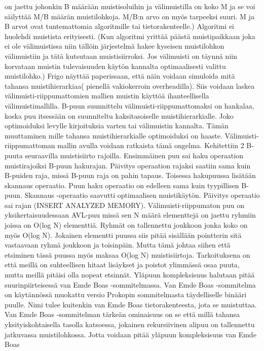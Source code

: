 \documentclass[finnish]{tktltiki2}
\theoremstyle{definition}
\theoremstyle{remark}
\begin{document}
on jaettu johonkin B määrään muistisoluihin ja välimuistilla on koko M ja se
voi säilyttää M/B määrän muistilohkoja. M/B:n arvo on myös tarpeeksi suuri.
M ja B arvot ovat tuntemattomia algoritmille tai tietorakenteelle.) Algoritmi
ei huolehdi muistista erityisesti. (Kun algoritmi yrittää päästä muistipaikkaan
joka ei ole välimuistissa niin tällöin järjestelmä hakee kyseisen muistilohkon
välimuistiin ja tätä kutsutaan muistisiirroksi. Jos välimuisti on täynnä niin
korvataan muistin tulevaisuuden käytön kannalta optimaalisesti valittu
muistilohko.) Frigo näyttää paperissaan, että näin voidaan simuloida mitä
tahansa muistihierarkiaa( pienellä vakiokerroin overheadilla). Siis voidaan
laskea välimuisti-riippumattomien mallien muistin käyttöä ihanteellisella
välimuistimallilla.
  B-puun suunnittelu välimuisti-riippumattomaksi on hankalaa, koska puu
itsessään on suunniteltu kaksitasoiselle muistihierarkialle. Joko optimoiduksi
levylle kirjoituksia varten tai välimuistin kannalta. Tämän muuttaminen mille
tahansa muistihierarkialle optimoiduksi on haaste.
  Välimuisti-riippumattoman mallin avulla voidaan ratkaista tämä ongelma.
Kehitettiin 2 B-puuta seuraavilla muistisiirto rajoilla. Ensimmäinen puu sai
haku operaation muistirajoiksi B-puun hakurajan. Päivitys operaation rajaksi
saatiin sama kuin B-puiden raja, missä B-puun raja on pahin tapaus. Toisessa
hakupuussa lisätään skannaus operaatio. Puun haku operaatio on edelleen sama
kuin tyypillisen B-puun. Skannaus -operaatio saavutti optimaalisen
muistikäytön. Päivitys operaatio sai rajan (INSERT ANALYZED MEMORY).
  Välimuisti-riippumaton puu on yksikertaisuudessaan AVL-puu missä sen
N määrä elementtejä on jaettu ryhmiin joissa on O(log N) elementtiä. Ryhmät on
tallennettu joukkoon jonka koko on myös O(log N). Jokainen elementti puussa
siis pitää sisällään pointterin sitä vastaavaan ryhmä joukkoon ja toisinpäin.
Mutta tämä johtaa siihen että etsiminen tässä puussa myös maksaa O(log N)
muistisiirtoja. Tarkoituksena on että meillä on suhteellisen hitaat lisäykset
ja poistot ylimmässä osaa puuta, mutta meillä pitäisi olla nopeat etsinnät.
  Yläpuun kompleksisuus halutaan pitää suurinpiirteisessä van Emde
Boas -sommitelmassa. Van Emde Boas -sommitelma on käytännössä muokattu versio
Prokopin sommitelmasta täydelliselle binääri puulle. Nimi tulee kuitenkin van
Emde Boas tietorakenteesta, jota se muistuttaa. Van Emde Boas -sommitelman
tärkeän ominaisuus on se että millä tahansa yksityiskohtaisella tasolla
katsoessa, jokainen rekursiivinen alipuu on tallennettu jatkuvassa
muistilohkossa. Jotta voidaan pitää yläpuun kompleksisuus van Emde Boas
\end{document}
